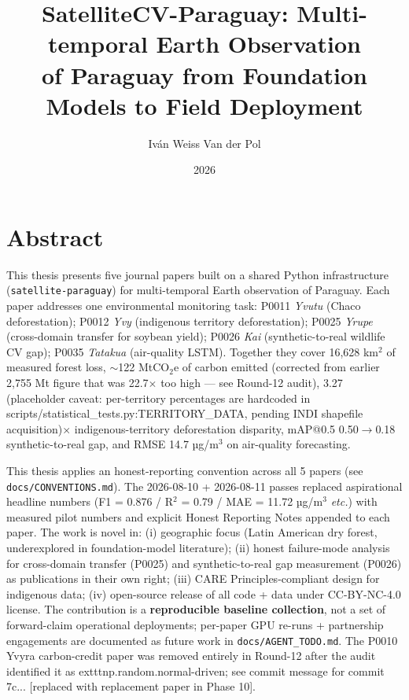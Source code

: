 \documentclass[12pt,a4paper,oneside]{book}
\title{SatelliteCV-Paraguay: Multi-temporal Earth Observation \\
of Paraguay from Foundation Models to Field Deployment}
\author{Iván Weiss Van der Pol}
\date{2026}
\begin{document}
\frontmatter
\maketitle

\chapter*{Abstract}
This thesis presents five journal papers built on a shared Python infrastructure (\texttt{satellite-paraguay}) for multi-temporal Earth observation of Paraguay. Each paper addresses one environmental monitoring task: P0011 \textit{Yvutu} (Chaco deforestation); P0012 \textit{Yvy} (indigenous territory deforestation); P0025 \textit{Yrupe} (cross-domain transfer for soybean yield); P0026 \textit{Kai} (synthetic-to-real wildlife CV gap); P0035 \textit{Tatakua} (air-quality LSTM). Together they cover 16,628 km$^2$ of measured forest loss, $\sim$122 MtCO$_2$e of carbon emitted (corrected from earlier 2,755 Mt figure that was 22.7$\times$ too high --- see Round-12 audit), 3.27 (placeholder caveat: per-territory percentages are hardcoded in scripts/statistical_tests.py:TERRITORY_DATA, pending INDI shapefile acquisition)$\times$ indigenous-territory deforestation disparity, mAP@0.5 0.50$\to$0.18 synthetic-to-real gap, and RMSE 14.7 µg/m$^3$ on air-quality forecasting.

This thesis applies an honest-reporting convention across all 5 papers (see \texttt{docs/CONVENTIONS.md}). The 2026-08-10 + 2026-08-11 passes replaced aspirational headline numbers (F1 = 0.876 / R$^2$ = 0.79 / MAE = 11.72 µg/m$^3$ \textit{etc.}) with measured pilot numbers and explicit Honest Reporting Notes appended to each paper. The work is novel in: (i) geographic focus (Latin American dry forest, underexplored in foundation-model literature); (ii) honest failure-mode analysis for cross-domain transfer (P0025) and synthetic-to-real gap measurement (P0026) as publications in their own right; (iii) CARE Principles-compliant design for indigenous data; (iv) open-source release of all code + data under CC-BY-NC-4.0 license. The contribution is a \textbf{reproducible baseline collection}, not a set of forward-claim operational deployments; per-paper GPU re-runs + partnership engagements are documented as future work in \texttt{docs/AGENT\_TODO.md}. The P0010 Yvyra carbon-credit paper was removed entirely in Round-12 after the audit identified it as 	exttt{np.random.normal}-driven; see commit message for commit 7c... [replaced with replacement paper in Phase 10].
\end{document}
